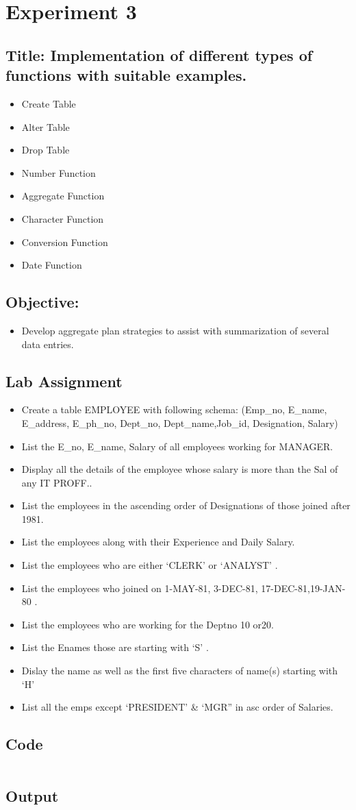 \documentclass{article}
\begin{document}
\section*{Experiment 3}
\subsection*{\textbf{Title:} Implementation of different types of functions with suitable examples.}
\begin{itemize}
	\item Create Table
	\item Alter Table
	\item Drop Table
	\item Number Function
	\item Aggregate Function
	\item Character Function
	\item Conversion Function
	\item Date Function
\end{itemize}
\subsection*{\textbf{Objective:}}
\begin{itemize}
	\item Develop aggregate plan strategies to assist with summarization of several data entries.
\end{itemize}
\subsection*{Lab Assignment}
\begin{itemize}
	\item Create a table EMPLOYEE with following schema: (Emp_no, E_name, E_address, E_ph_no, Dept_no, Dept_name,Job_id, Designation, Salary)
	\item List the E_no, E_name, Salary of all employees working for MANAGER.
	\item Display all the details of the employee whose salary is more than the Sal of any IT PROFF..
	\item List the employees in the ascending order of Designations of those joined after 1981.
	\item List the employees along with their Experience and Daily Salary.
	\item List the employees who are either ‘CLERK’ or ‘ANALYST’ .
	\item List the employees who joined on 1-MAY-81, 3-DEC-81, 17-DEC-81,19-JAN-80 .
	\item List the employees who are working for the Deptno 10 or20.
	\item List the Enames those are starting with ‘S’ .
	\item Dislay the name as well as the first five characters of name(s) starting with ‘H’
	\item  List all the emps except ‘PRESIDENT’ \& ‘MGR” in asc order of Salaries.
\end{itemize}
\subsection*{Code}
\inputminted{sql}{code/3.sql}
\subsection*{Output}

\end{document}

